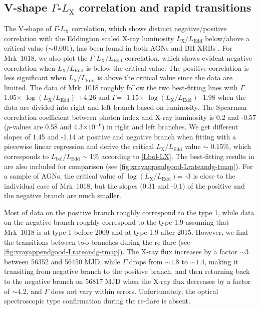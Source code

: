 \documentclass[twocolumn]{aastex63}
\begin{document}
\subsection{V-shape $\Gamma$-$L_\mathrm{X}$ correlation and rapid transitions}
The V-shape of $\Gamma$-$L_\mathrm{X}$ correlation, which shows distinct negative/positive correlation with the Eddington scaled X-ray luminosity $L_\mathrm{X}/L_\mathrm{Edd}$ below/above a critical value ($\sim$0.001), has been found in both AGNs and BH XRBs \citep[e.g.][]{2008ApJ...682..212W,2011A&A...530A.149Y,2015MNRAS.447.1692Y}. For Mrk~1018, we also plot the $\Gamma$-$L_\mathrm{X}/L_\mathrm{Edd}$ correlation, which shows evident negative correlation when $L_\mathrm{X}/L_\mathrm{Edd}$ is below the critical value. The positive correlation is less significant when $L_\mathrm{X}/L_\mathrm{Edd}$ is above the critical value since the data are limited. The data of Mrk~1018 roughly follow the two best-fitting lines with $\Gamma$= 1.05$\times$ $\log(L_\mathrm{X}/L_\mathrm{Edd})$ +4.26 and $\Gamma$= -1.15$\times$ $ \log(L_\mathrm{X}/L_\mathrm{Edd})$ -1.98 when the data are divided into right and left branch based on luminosity. The Spearman correlation coefficient between photon index and X-ray luminosity is 0.2 and -0.57 ($p$-values are 0.58 and 4.3$\times10^{-6}$) in right and left branches. We get different slopes of 1.45 and -1.14 at positive and negative branch when fitting with a piecewise linear regression and derive the critical $L_\mathrm{X}/L_\mathrm{Edd}$ value $\sim$ 0.15\%, which corresponds to $L_\mathrm{bol}/L_\mathrm{Edd}\sim$1\% according to \autoref{Lbol-LX}. The best-fitting results in \citet{2015MNRAS.447.1692Y} are also included for comparison (see \autoref{fig:xrayappendgood-Lrateandg-tmap}). For a sample of AGNs, the critical value of $\log(L_\mathrm{X}/L_\mathrm{Edd})$= -3 is close to the individual case of Mrk~1018, but the slopes (0.31 and -0.1) of the positive and the negative branch are much smaller. 

Most of data on the positive branch roughly correspond to the type 1, while data on the negative branch roughly correspond to the type 1.9 assuming that Mrk~1018 is at type 1 before 2009 and at type 1.9 after 2015. However, we find the transitions between two branches during the re-flare (see \autoref{fig:xrayappendgood-Lrateandg-tmap}). The X-ray flux increases by a factor $\sim3$ between 56352 and 56450 MJD, while $\Gamma$ drops from $\sim1.8$ to $\sim1.4$, making it transiting from negative branch to the positive branch, and then returning back to the negative branch on 56817 MJD when the X-ray flux decreases by a factor of $\sim$4.2, and $\Gamma$ does not vary within errors. Unfortunately, the optical spectroscopic type confirmation during the re-flare is absent.
\end{document}

